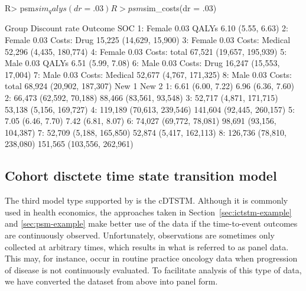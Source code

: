 \documentclass[article, nojss]{jss}\usepackage[]{graphicx}\usepackage[]{color}
\begin{document}
\begin{Schunk}
\begin{Sinput}
R> psm$sim_qalys(dr = .03) 
R> psm$sim_costs(dr = .03)
\end{Sinput}
\end{Schunk}

\begin{Schunk}
\begin{Soutput}
    Group Discount rate        Outcome                      SOC
1: Female          0.03          QALYs        6.10 (5.55, 6.63)
2: Female          0.03    Costs: Drug  15,225 (14,629, 15,900)
3: Female          0.03 Costs: Medical  52,296 (4,435, 180,774)
4: Female          0.03   Costs: total 67,521 (19,657, 195,939)
5:   Male          0.03          QALYs        6.51 (5.99, 7.08)
6:   Male          0.03    Costs: Drug  16,247 (15,553, 17,004)
7:   Male          0.03 Costs: Medical  52,677 (4,767, 171,325)
8:   Male          0.03   Costs: total 68,924 (20,902, 187,307)
                       New 1                      New 2
1:         6.61 (6.00, 7.22)          6.96 (6.36, 7.60)
2:   66,473 (62,592, 70,188)    88,466 (83,561, 93,548)
3:   52,717 (4,871, 171,715)    53,138 (5,156, 169,727)
4: 119,189 (70,613, 239,546)  141,604 (92,445, 260,157)
5:         7.05 (6.46, 7.70)          7.42 (6.81, 8.07)
6:   74,027 (69,772, 78,081)   98,691 (93,156, 104,387)
7:   52,709 (5,188, 165,850)    52,874 (5,417, 162,113)
8: 126,736 (78,810, 238,080) 151,565 (103,556, 262,961)
\end{Soutput}
\end{Schunk}

\subsection{Cohort disctete time state transition model} \label{sec:cdtstm-example}
The third model type supported by  is the cDTSTM. Although it is commonly used in health economics, the approaches taken in Section~\ref{sec:ictstm-example} and \ref{sec:psm-example} make better use of the data if the time-to-event outcomes are continuously observed. Unfortunately, observations are sometimes only collected at arbitrary times, which results in what is referred to as panel data. This may, for instance, occur in routine practice oncology data when progression of disease is not continuously evaluated. To facilitate analysis of this type of data, we have converted the  dataset from above into panel form. 
\end{document}
